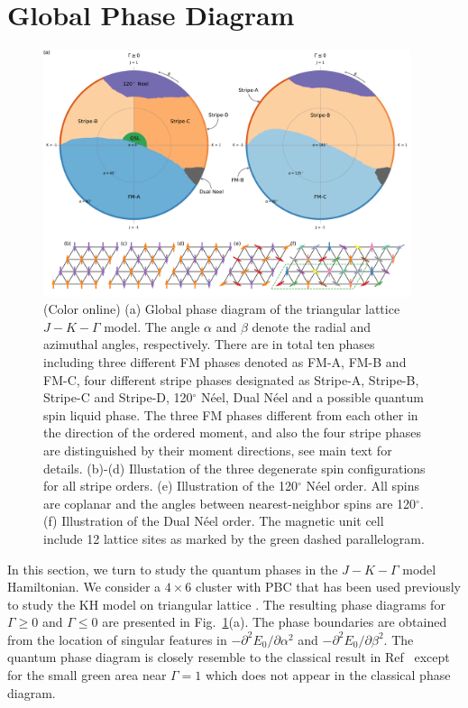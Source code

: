 \documentclass[aps,prb,reprint,amsfonts,amsmath,amssymb,showpacs,groupedaddress,superscriptaddress]{revtex4-1}
\begin{document}
\section{\label{sec:SectionIV}Global Phase Diagram}
\begin{figure}
    \centering
    \includegraphics[width=0.96\textwidth]{Fig2.pdf}
    \caption{\label{fig:PhaseDiagram}(Color online) (a) Global phase diagram of the triangular lattice $J-K-\Gamma$ model. The angle $\alpha$ and $\beta$ denote the radial and azimuthal angles, respectively. There are in total ten phases including three different FM phases denoted as FM-A, FM-B and FM-C, four different stripe phases designated as Stripe-A, Stripe-B, Stripe-C and Stripe-D, 120$^\circ$ N\'{e}el, Dual N\'{e}el and a possible quantum spin liquid phase. The three FM phases different from each other in the direction of the ordered moment, and also the four stripe phases are distinguished by their moment directions, see main text for details. (b)-(d) Illustation of the three degenerate spin configurations for all stripe orders. (e) Illustration of the 120$^\circ$ N\'{e}el order. All spins are coplanar and the angles between nearest-neighbor spins are 120$^\circ$. (f) Illustration of the Dual N\'{e}el order. The magnetic unit cell include 12 lattice sites as marked by the green dashed parallelogram.}
\end{figure}

In this section, we turn to study the quantum phases in the $J-K-\Gamma$ model Hamiltonian. We consider a $4 \times 6$ cluster with PBC that has been used previously to study the KH model on triangular lattice \cite{KaiLi2015}. The resulting phase diagrams for $\Gamma \geq 0$ and $\Gamma \leq 0$ are presented in Fig.~\ref{fig:PhaseDiagram}(a). The phase boundaries are obtained from the location of singular features in $-\partial^2E_0/\partial\alpha^2$ and $-\partial^2E_0/\partial\beta^2$. The quantum phase diagram is closely resemble to the classical result in Ref~ except for the small green area near $\Gamma=1$ which does not appear in the classical phase diagram.
\end{document}
